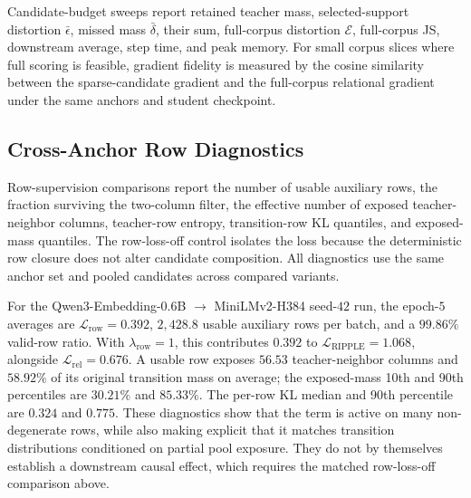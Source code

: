 Candidate-budget sweeps report retained teacher mass, selected-support distortion $\bar\epsilon$, missed mass $\bar\delta$, their sum, full-corpus distortion $\mathcal E$, full-corpus JS, downstream average, step time, and peak memory. For small corpus slices where full scoring is feasible, gradient fidelity is measured by the cosine similarity between the sparse-candidate gradient and the full-corpus relational gradient under the same anchors and student checkpoint.

\subsection{Cross-Anchor Row Diagnostics}

Row-supervision comparisons report the number of usable auxiliary rows, the fraction surviving the two-column filter, the effective number of exposed teacher-neighbor columns, teacher-row entropy, transition-row KL quantiles, and exposed-mass quantiles. The row-loss-off control isolates the loss because the deterministic row closure does not alter candidate composition. All diagnostics use the same anchor set and pooled candidates across compared variants.

For the Qwen3-Embedding-0.6B $\rightarrow$ MiniLMv2-H384 seed-$42$ run, the epoch-$5$ averages are $\mathcal L_{\mathrm{row}}=0.392$, $2{,}428.8$ usable auxiliary rows per batch, and a $99.86\%$ valid-row ratio. With $\lambda_{\mathrm{row}}=1$, this contributes $0.392$ to $\mathcal L_{\mathrm{RIPPLE}}=1.068$, alongside $\mathcal L_{\mathrm{rel}}=0.676$. A usable row exposes $56.53$ teacher-neighbor columns and $58.92\%$ of its original transition mass on average; the exposed-mass 10th and 90th percentiles are $30.21\%$ and $85.33\%$. The per-row KL median and 90th percentile are $0.324$ and $0.775$. These diagnostics show that the term is active on many non-degenerate rows, while also making explicit that it matches transition distributions conditioned on partial pool exposure. They do not by themselves establish a downstream causal effect, which requires the matched row-loss-off comparison above.
